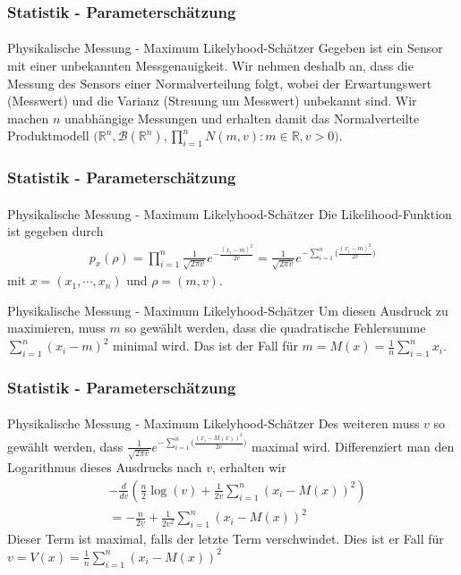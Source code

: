 \documentclass{beamer}
\begin{document}
\begin{frame}
    \frametitle{Statistik - Parameterschätzung}
\framesubtitle{}
\begin{block}{Physikalische Messung - Maximum Likelyhood-Schätzer}
Gegeben ist ein Sensor mit einer unbekannten Messgenauigkeit. Wir nehmen deshalb an, dass die Messung des Sensors einer Normalverteilung folgt, 
wobei der Erwartungswert (Messwert) und die Varianz (Streuung um Messwert) unbekannt sind. Wir machen $n$ unabhängige Messungen und erhalten damit das Normalverteilte Produktmodell $\bigl(\mathbb{R}^n, \mathcal{B}(\mathbb{R}^n), \prod_{i=1}^n N(m,v): m \in \mathbb{R}, v  >0 \bigr)$. 

\end{block}

 \end{frame}



\begin{frame}
    \frametitle{Statistik - Parameterschätzung}
\framesubtitle{}
\begin{block}{Physikalische Messung - Maximum Likelyhood-Schätzer}
Die Likelihood-Funktion ist gegeben durch
\begin{align*}
p_x(\rho) =  \prod_{i=1}^n \frac {1}{ \sqrt{2 \pi v }} e^{- \frac{(x_i- m)^2}{ 2v}} =  \frac {1}{ \sqrt{2 \pi v }} e^{- \sum_{i=1}^n \bigl( \frac{(x_i- m)^2}{ 2v} \bigr)} 
\end{align*} 
mit $x = (x_1, \cdots, x_n)$ und $\rho=(m,v)$.
\end{block}

\begin{block}{Physikalische Messung - Maximum Likelyhood-Schätzer}
Um diesen Ausdruck zu maximieren, muss $m$ so gewählt werden, dass die quadratische Fehlersumme $ \sum_{i=1}^n (x_i- m)^2$ minimal wird.  Das ist der Fall für $m= M(x)= \frac{1}{n} \sum_{i=1}^n x_i$.
\end{block}

 \end{frame}

\begin{frame}
    \frametitle{Statistik - Parameterschätzung}
\framesubtitle{}
\begin{block}{Physikalische Messung - Maximum Likelyhood-Schätzer}
Des weiteren muss $v$ so gewählt werden, dass $ \frac {1}{ \sqrt{2 \pi v }} e^{- \sum_{i=1}^n \bigl( \frac{(x_i- M(x))^2}{ 2v} \bigr)}$ maximal wird. Differenziert man den Logarithmus dieses Ausdrucks nach $v$, erhalten wir
\begin{align*}
& -\frac{d}{dv} (\frac{n}{2} \log(v) + \frac{1}{2v} \sum_{i=1}^n (x_i - M(x))^2 ) \\
& = -\frac{n}{2v} + \frac{1}{2v^2}\sum_{i=1}^n (x_i - M(x))^2 
\end{align*}
Dieser Term ist maximal, falls der letzte Term verschwindet. Dies ist er Fall für
$v = V(x) =\frac{1}{n}\sum_{i=1}^n (x_i - M(x))^2$
\end{block}

 \end{frame}
\end{document}
